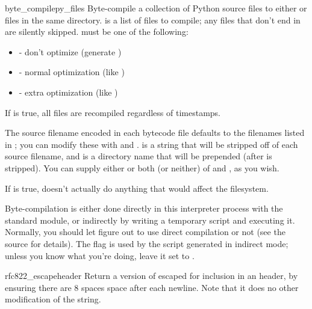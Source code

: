 \documentclass{manual}
\begin{document}
\begin{funcdesc}{byte_compile}{py_files}
Byte-compile a collection of Python source files to either 
or  files in the same directory.   is a list of files
to compile; any files that don't end in  are silently skipped.
 must be one of the following:
\begin{itemize}
\item {} - don't optimize (generate )
\item {} - normal optimization (like )
\item {} - extra optimization (like )
\end{itemize}

If  is true, all files are recompiled regardless of
timestamps.

The source filename encoded in each bytecode file defaults to the
filenames listed in ; you can modify these with  and
.   is a string that will be stripped off of each
source filename, and  is a directory name that will be
prepended (after  is stripped).  You can supply either or both
(or neither) of  and , as you wish.

If  is true, doesn't actually do anything that would
affect the filesystem.

Byte-compilation is either done directly in this interpreter process
with the standard  module, or indirectly by writing a
temporary script and executing it.  Normally, you should let
 figure out to use direct compilation or not (see
the source for details).  The  flag is used by the script
generated in indirect mode; unless you know what you're doing, leave
it set to .
\end{funcdesc}

\begin{funcdesc}{rfc822_escape}{header}
Return a version of  escaped for inclusion in an
 header, by ensuring there are 8 spaces space after each newline.
Note that it does no other modification of the string.
\end{funcdesc}
\end{document}
